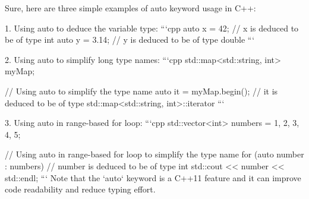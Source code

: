 Sure, here are three simple examples of auto keyword usage in C++:

1. Using auto to deduce the variable type:
```cpp
auto x = 42;  // x is deduced to be of type int
auto y = 3.14; // y is deduced to be of type double
```

2. Using auto to simplify long type names:
```cpp
std::map<std::string, int> myMap;

// Using auto to simplify the type name
auto it = myMap.begin(); // it is deduced to be of type std::map<std::string, int>::iterator
```

3. Using auto in range-based for loop:
```cpp
std::vector<int> numbers = {1, 2, 3, 4, 5};

// Using auto in range-based for loop to simplify the type name
for (auto number : numbers) { // number is deduced to be of type int
    std::cout << number << std::endl;
}
```
Note that the `auto` keyword is a C++11 feature and it can improve code readability and reduce typing effort.
